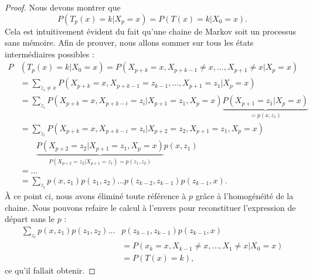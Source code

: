 \begin{proof}
	Nous devons montrer que
	\begin{equation}
		P(T_p(x)=k|X_p=x)=P(T(x)=k|X_0=x).
	\end{equation}
	Cela est intuitivement évident du fait qu'une chaine de Markov soit un processus sans mémoire. Afin de prouver, nous allons sommer sur tous les états intermédiaires possibles :
	\begin{subequations}
		\begin{align}
			P & (T_p(x)=k|X_0=x)=P(X_{p+k}=x,X_{p+k-1}\neq x,\ldots,X_{p+1}\neq x|X_p=x)                             \\
			  & =\sum_{z_i\neq x}P(X_{p+k}=x,X_{p+k-1}=z_{k-1},\ldots,X_{p+1}=z_1|X_p=x)                             \\
			  & =\sum_{z_i}P(X_{p+k}=x,X_{p+k-i}=z_i|X_{p+1}=z_1,X_p=x)\underbrace{P(X_{p+1}=z_1|X_p=x)}_{=p(x,z_1)} \\
			  & =\sum_{z_i}P(X_{p+k}=x,X_{p+k-i}=z_i|X_{p+2}=z_2,X_{p+1}=z_1,X_p=x)                                  \\
			  & \qquad\underbrace{P(X_{p+2}=z_2|X_{p+1}=z_1,X_p=x)}_{P(X_{p+2}=z_2|X_{p+1}=z_1)=p(z_1,z_2)}p(x,z_1)  \\
			  & =\ldots                                                                                              \\
			  & =\sum_{z_i}p(x,z_1)p(z_1,z_2)\ldots p(z_{k-2},z_{k-1})p(z_{k-1},x).
		\end{align}
	\end{subequations}
	À ce point ci, nous avons éliminé toute référence à \( p\) grâce à l'homogénéité de la chaine. Nous pouvons refaire le calcul à l'envers pour reconstituer l'expression de départ sans le \( p\) :
	\begin{subequations}
		\begin{align}
			\sum_{z_i}p(x,z_1)p(z_1,z_2)\ldots & p(z_{k-1},z_{k-1})p(z_{k-1},x)                 \\
			                                   & =P(x_k=x,X_{k-1}\neq x,\ldots,X_1\neq x|X_0=x) \\
			                                   & =P(T(x)=k),
		\end{align}
	\end{subequations}
	ce qu'il fallait obtenir.
\end{proof}

